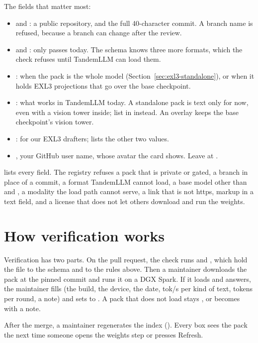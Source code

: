 The fields that matter most:

\begin{itemize}
\item {} and : a public repository, and the full 40-character commit. A branch name is refused, because a branch can change after the review.
\item {} and : only  passes today. The schema knows three more formats, which the check refuses until TandemLLM can load them.
\item {}:  when the pack is the whole model (Section~\ref{sec:exl3-standalone}), or  when it holds EXL3 projections that go over the base checkpoint.
\item {}: what works in TandemLLM today. A standalone pack is text only for now, even with a vision tower inside; list  in  instead. An overlay keeps the base checkpoint's vision tower.
\item {}:  for our EXL3 drafters;  lists the other two values.
\item {}, your GitHub user name, whose avatar the card shows. Leave  at .
\end{itemize}

 lists every field. The registry refuses a pack that is private or gated, a branch in place of a commit, a format TandemLLM cannot load, a base model other than  and , a modality the load path cannot serve, a link that is not https, markup in a text field, and a license that does not let others download and run the weights.

\section{How verification works}\label{sec:community-verify}

Verification has two parts. On the pull request, the  check runs  and , which hold the file to the schema and to the rules above. Then a maintainer downloads the pack at the pinned commit and runs it on a DGX Spark. If it loads and answers, the maintainer fills  (the build, the device, the date, tok/s per kind of text, tokens per round, a note) and sets  to . A pack that does not load stays , or becomes  with a note.

After the merge, a maintainer regenerates the index (). Every box sees the pack the next time someone opens the weights step or presses Refresh.
